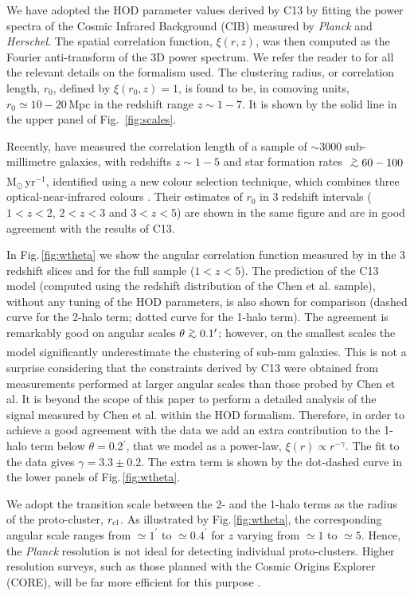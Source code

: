 \documentclass[useAMS,usenatbib]{mn2e}
\def\gsim{\,\lower2truept\hbox{${> \atop\hbox{\raise4truept\hbox{$\sim$}}}$}\,}
\begin{document}
We have adopted the HOD parameter values derived by C13 by
fitting the power spectra of the Cosmic Infrared Background (CIB)
measured by \textit{Planck} and \textit{Herschel}. The spatial
correlation function, $\xi(r,z)$, was then computed as the Fourier
anti-transform of the 3D power spectrum. We refer the reader to
\citet{Xia12}  for all the relevant details on
the formalism used. The clustering radius,
or correlation length,
$r_0$, defined by $\xi(r_{0},z)=1$, is found to
be, in comoving units, $r_0\simeq 10-20\,$Mpc in the redshift range
$z\sim1-7$. It is shown by the solid line in the upper panel of
Fig.~\ref{fig:scales}.

Recently, \cite{Chen2016b} have measured the
correlation length of a sample of $\sim3000$ sub-millimetre galaxies, with redshifts $z\sim1-5$
and star formation rates $\gsim60-100$M$_{\odot}\,$yr$^{-1}$, identified using a new
colour selection technique, which combines three optical-near-infrared
colours \citep{Chen2016a}. Their estimates of $r_0$ in 3 redshift intervals ($1< z <2$, $2< z <3$ and $3< z <5$) are shown in the same
figure and are in good agreement with the results of C13.

In Fig.\,\ref{fig:wtheta} we show the angular correlation function measured by \cite{Chen2016b} in the 3 redshift slices and for the full sample ($1< z <5$). The prediction of the C13 model (computed using the redshift distribution of the Chen et
al. sample), without any tuning of the HOD parameters, is also shown for comparison (dashed
curve for the 2-halo term; dotted curve for the 1-halo term). The
agreement is remarkably good on angular scales
$\theta\gsim0.1^{\prime}$; however, on the smallest scales the model significantly
underestimate the clustering of sub-mm galaxies. This is not a
surprise considering that the constraints derived by C13 were obtained from measurements performed at larger angular scales than those probed by Chen et al. It is beyond
the scope of this paper to perform a detailed  analysis of the signal measured by
Chen et al. within the HOD formalism. Therefore, in order to achieve a good agreement with the data we add an extra contribution to
the 1-halo term below $\theta=$0.2$^{\prime}$, that we model as a power-law,
$\xi(r)\propto r^{-\gamma}$.  The fit to the data gives
$\gamma=3.3\pm0.2$. The extra term is shown by the dot-dashed curve in
the lower panels of Fig.\,\ref{fig:wtheta}.

We adopt the transition scale between the 2- and the 1-halo terms as
the radius of the proto-cluster, $r_{\rm cl}$. As illustrated by Fig.\,\ref{fig:wtheta}, the corresponding angular scale ranges from $\simeq 1^\prime$ to $\simeq 0.4^\prime$ for $z$ varying from $\simeq 1$ to $\simeq 5$. Hence, the \textit{Planck} resolution is not ideal for detecting individual proto-clusters. Higher resolution surveys, such as those planned with the Cosmic Origins Explorer (CORE), will be far more efficient for this purpose \citep{DeZotti2016}.
\end{document}
